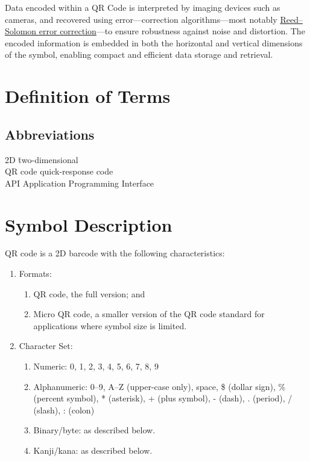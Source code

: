 \documentclass[../main]{subfiles}
\begin{document}
Data encoded within a QR Code is interpreted by imaging devices such as cameras, and recovered using error---correction algorithms—most notably \href{https://en.wikipedia.org/wiki/Reed\%E2\%80\%93Solomon_error_correction}{Reed--Solomon error correction}---to ensure robustness against noise and distortion. The encoded information is embedded in both the horizontal and vertical dimensions of the symbol, enabling compact and efficient data storage and retrieval.\cite{wikipedia-qr}

\section{Definition of Terms}

\subsection{Abbreviations}

\begin{tabbing}
  2D \hspace{3em} \= two-dimensional \cite{mw-2d} \\
  QR code \> quick-response code \cite{wikipedia-qr} \\
  API \> Application Programming Interface \cite{wikipedia-api} \\
\end{tabbing}

\section{Symbol Description}

QR code is a 2D barcode with the following characteristics:

\begin{enumerate}
  \item Formats:
    \begin{enumerate}[label=\alph*.]
      \item QR code, the full version; and
      \item Micro QR code, a smaller version of the QR code standard for applications where symbol size is limited.
    \end{enumerate}
  \item Character Set\cite{wikipedia-qr}:
    \begin{enumerate}[label=\alph*.]
      \item Numeric: 0, 1, 2, 3, 4, 5, 6, 7, 8, 9
      \item Alphanumeric: 0–9, A–Z (upper-case only), space, \$ (dollar sign), \% (percent symbol), * (asterisk), + (plus symbol), - (dash), . (period), / (slash), : (colon) 
      \item Binary/byte:  as described below.
      \item Kanji/kana:  as described below.
    \end{enumerate}
\end{enumerate}
\end{document}
